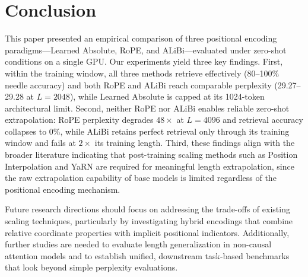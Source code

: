 \documentclass[conference]{IEEEtran}
\begin{document}
\section{Conclusion}
\label{sec:conclusion}

This paper presented an empirical comparison of three positional encoding paradigms---Learned Absolute, RoPE, and ALiBi---evaluated under zero-shot conditions on a single GPU. Our experiments yield three key findings. First, within the training window, all three methods retrieve effectively (80--100\% needle accuracy) and both RoPE and ALiBi reach comparable perplexity (29.27--29.28 at $L{=}2048$), while Learned Absolute is capped at its 1024-token architectural limit. Second, neither RoPE nor ALiBi enables reliable zero-shot extrapolation: RoPE perplexity degrades $48\times$ at $L{=}4096$ and retrieval accuracy collapses to 0\%, while ALiBi retains perfect retrieval only through its training window and fails at $2\times$ its training length. Third, these findings align with the broader literature indicating that post-training scaling methods such as Position Interpolation and YaRN are required for meaningful length extrapolation, since the raw extrapolation capability of base models is limited regardless of the positional encoding mechanism.

Future research directions should focus on addressing the trade-offs of existing scaling techniques, particularly by investigating hybrid encodings that combine relative coordinate properties with implicit positional indicators. Additionally, further studies are needed to evaluate length generalization in non-causal attention models and to establish unified, downstream task-based benchmarks that look beyond simple perplexity evaluations.
\end{document}
